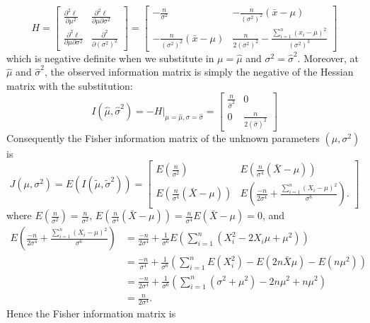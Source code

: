 \documentclass[11pt,fleqn]{book} %
\begin{document}
\begin{example}
\[
H = \begin{bmatrix}
\frac{\partial^2\ell}{\partial\mu^2} & \frac{\partial^2\ell}{\partial\mu\partial\sigma^2} \\
\frac{\partial^2\ell}{\partial\mu\partial\sigma^2} & \frac{\partial^2}{\partial(\sigma^2)^2}
\end{bmatrix} = \begin{bmatrix}
-\frac{n}{\sigma^2} & -\frac{n}{(\sigma^2)^2}(\bar{x} - \mu) \\
-\frac{n}{(\sigma^2)^2}(\bar{x} - \mu) & \frac{n}{2(\sigma^2)^2} - \frac{\sum_{i=1}^n(x_i - \mu)^2}{(\sigma^2)^3}
\end{bmatrix}
\]
which is negative definite when we substitute in \(\mu = \hat{\mu}\) and \(\sigma^2 = \hat{\sigma}^2\). Moreover, at \(\hat{\mu}\) and \(\hat{\sigma}^2\), the observed information matrix is simply the negative of the Hessian matrix with the substitution:
\[
I(\hat{\mu}, \hat{\sigma}^2) = \left.-H\right|_{\mu = \hat{\mu}, \sigma = \hat{\sigma}} = \begin{bmatrix}
\frac{n}{\hat{\sigma}^2} & 0 \\
0 & \frac{n}{2(\hat{\sigma})^2}
\end{bmatrix}
\]
\indent Consequently the Fisher information matrix of the unknown parameters \((\mu, \sigma^2)\) is
\[
J(\mu, \sigma^2) = E(I(\tilde{\mu}, \tilde{\sigma}^2)) = \begin{bmatrix}
E\left(\frac{n}{\sigma^2}\right) & E\left(\frac{n}{\sigma^4}(\bar{X} - \mu)\right) \\
E\left(\frac{n}{\sigma^4}(\bar{X} - \mu)\right) & E\left(\frac{-n}{2\sigma^4} + \frac{\sum_{i=1}^n (X_i - \mu)^2}{\sigma^6}\right).
\end{bmatrix}
\]
where \(E\left(\frac{n}{\sigma^2}\right) = \frac{n}{\sigma^2}\), \(E\left(\frac{n}{\sigma^4}(\bar{X} - \mu)\right) = \frac{n}{\sigma^4}E(\bar{X} - \mu) = 0\), and
\[
\begin{aligned}
E\left(\frac{-n}{2\sigma^4} + \frac{\sum_{i=1}^n(X_i - \mu)^2}{\sigma^6}\right) &= \frac{-n}{2\sigma^4} + \frac{1}{\sigma^6}E\left(\sum_{i=1}^n(X_i^2 - 2X_i\mu + \mu^2)\right) \\
&= \frac{-n}{\sigma^4} + \frac{1}{\sigma^6}\left(\sum_{i=1}^n E(X_i^2) - E(2n\bar{X}\mu) - E(n\mu^2)\right) \\
&= \frac{-n}{2\sigma^4} + \frac{1}{\sigma^6}\left(\sum_{i=1}^n(\sigma^2 + \mu^2) - 2n\mu^2 + n\mu^2\right) \\
&= \frac{n}{2\sigma^4}.
\end{aligned}
\]
\indent Hence the Fisher information matrix is

\end{example}
\end{document}
